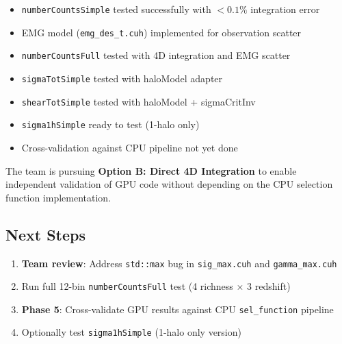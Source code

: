 \documentclass[a4paper, 11pt]{article}
\begin{document}
\begin{itemize}
  \item[\textcolor{green!50!black}{$\checkmark$}] \texttt{numberCountsSimple} tested successfully with $<0.1\%$ integration error
  \item[\textcolor{green!50!black}{$\checkmark$}] EMG model (\texttt{emg\_des\_t.cuh}) implemented for observation scatter
  \item[\textcolor{green!50!black}{$\checkmark$}] \texttt{numberCountsFull} tested with 4D integration and EMG scatter
  \item[\textcolor{green!50!black}{$\checkmark$}] \texttt{sigmaTotSimple} tested with haloModel adapter
  \item[\textcolor{green!50!black}{$\checkmark$}] \texttt{shearTotSimple} tested with haloModel + sigmaCritInv
  \item[\textcolor{orange}{$\circ$}] \texttt{sigma1hSimple} ready to test (1-halo only)
  \item[\textcolor{red}{$\times$}] Cross-validation against CPU pipeline not yet done
\end{itemize}

The team is pursuing \textbf{Option B: Direct 4D Integration} to enable independent validation of GPU code without depending on the CPU selection function implementation.

\subsection{Next Steps}

\begin{enumerate}
  \item \textbf{Team review}: Address \texttt{std::max} bug in \texttt{sig\_max.cuh} and \texttt{gamma\_max.cuh}
  \item Run full 12-bin \texttt{numberCountsFull} test (4 richness $\times$ 3 redshift)
  \item \textbf{Phase 5}: Cross-validate GPU results against CPU \texttt{sel\_function} pipeline
  \item Optionally test \texttt{sigma1hSimple} (1-halo only version)
\end{enumerate}
\end{document}
